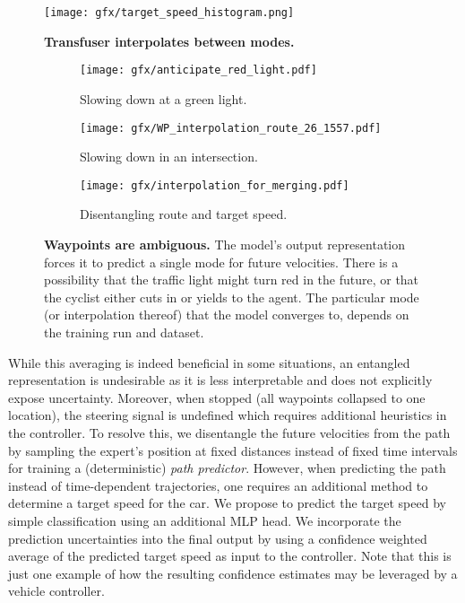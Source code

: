\begin{figure}[t]
\vspace{-0.7cm}
\begin{center}
   \texttt{[image: gfx/target\_speed\_histogram.png]}
\end{center}
\vspace{-0.5cm}
\caption{\textbf{Transfuser interpolates between modes.}}
\label{fig:histogram}
\vspace{-0.5cm}
\end{figure} 
\begin{figure*}[t]
\centering
    \begin{subfigure}[b]{0.33\textwidth}
        \centering
        \texttt{[image: gfx/anticipate\_red\_light.pdf]}
        \caption{Slowing down at a green light.}
        \label{fig:conservative_mode}
    \end{subfigure}
    \begin{subfigure}[b]{0.33\textwidth}  
        \centering 
        \texttt{[image: gfx/WP\_interpolation\_route\_26\_1557.pdf]}
        \caption{Slowing down in an intersection.}
        \label{fig:aggressive_mode}
    \end{subfigure}
    \begin{subfigure}[b]{0.33\textwidth}  
        \centering 
        \texttt{[image: gfx/interpolation\_for\_merging.pdf]}
        \caption{Disentangling route and target speed.}
        \label{fig:interpolating_modes}
    \end{subfigure}
    \vspace{-0.7cm}
   \caption{\textbf{Waypoints are ambiguous.} The model's output representation forces it to predict a single mode for future velocities. There is a possibility that the traffic light might turn red in the future, or that the cyclist either cuts in or yields to the agent. The particular mode (or interpolation thereof) that the model converges to, depends on the training run and dataset.}
\label{fig:waypoint_problem}
\vspace{-0.3cm}
\end{figure*}  
While this averaging is indeed beneficial in some situations, an entangled representation is undesirable as it is less interpretable and does not explicitly expose uncertainty. Moreover, when stopped (all waypoints collapsed to one location), the steering signal is undefined which requires additional heuristics in the controller. To resolve this, we disentangle the future velocities from the path by sampling the expert's position at fixed distances instead of fixed time intervals for training a (deterministic) \textit{path predictor}. However, when predicting the path instead of time-dependent trajectories, one requires an additional method to determine a target speed for the car. We propose to predict the target speed by simple classification using an additional MLP head. We incorporate the prediction uncertainties into the final output by using a confidence weighted average of the predicted target speed as input to the controller. Note that this is just one example of how the resulting confidence estimates may be leveraged by a vehicle controller.

